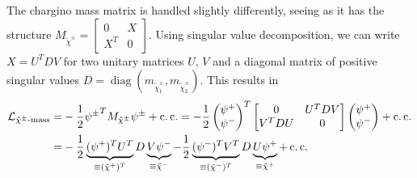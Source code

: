 \documentclass[../main.tex]{subfiles}
\begin{document}
The chargino mass matrix is handled slightly differently, seeing as it has the structure \(M_{\tilde\chi^\pm} = \begin{bmatrix}
  0 & X \\ X^T & 0
\end{bmatrix}\).
Using singular value decomposition, we can write \(X = U^T D V\) for two unitary matrices \(U\), \(V\) and a diagonal matrix of positive singular values \(D = \operatorname{diag}(m_{\tilde\chi^\pm_1}, m_{\tilde\chi^\pm_2})\).
This results in
\begin{align}
  \nonumber
  \L_{\tilde\chi^\pm\text{-mass}} = & -\frac{1}{2}{\psi^\pm}^T M_{\tilde\chi^\pm} \psi^\pm + \cc = -\frac{1}{2} \begin{pmatrix}
                                                                                                                  \psi^+ \\ \psi^-
                                                                                                                \end{pmatrix}^T \begin{bmatrix}
                                                                                                                                  0       & U^T D V \\
                                                                                                                                  V^T D U & 0
                                                                                                                                \end{bmatrix} \begin{pmatrix}
                                                                                                                                                \psi^+ \\ \psi^-
                                                                                                                                              \end{pmatrix} + \cc                                                                                                              \\
  \nonumber
  =                                 & -\frac{1}{2} \underbrace{(\psi^+)^T U^T}_{\equiv (\tilde\chi^+)^T} D \underbrace{V \psi^-}_{\equiv \tilde\chi^-} - \frac{1}{2} \underbrace{(\psi^-)^T V^T}_{\equiv (\tilde\chi^-)^T} D \underbrace{U \psi^+}_{\equiv \tilde\chi^+} + \cc \\

\end{align}
\end{document}
